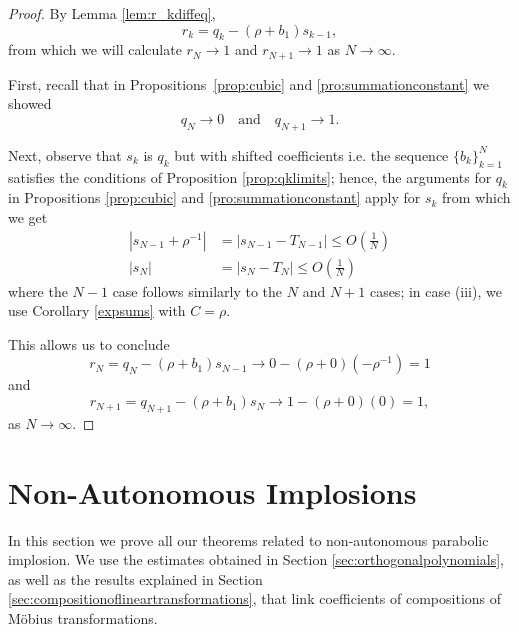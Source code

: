 \documentclass{amsart}
\theoremstyle{remark}
\theoremstyle{definition}
\newcommand{\lp}{\left(}
\newcommand{\rp}{\right)}
\begin{document}
\begin{proof}
    By Lemma \ref{lem:r_kdiffeq},
    \[r_k=q_k-(\rho+b_1)s_{k-1},\]
    from which we will calculate $r_N\rightarrow1$ and $r_{N+1}\rightarrow1$ as $N\rightarrow\infty$.

    First, recall that in Propositions~\ref{prop:cubic} and \ref{pro:summationconstant} we showed
    \[q_N\rightarrow0\quad \text{and}\quad q_{N+1}\rightarrow1.\]

    Next, observe that $s_k$ is $q_k$ but with shifted coefficients i.e. the sequence  $\{b_k\}_{k=1}^{N}$ satisfies the conditions of Proposition \ref{prop:qklimits}; hence, the arguments for $q_k$ in Propositions \ref{prop:cubic} and \ref{pro:summationconstant} apply for $s_k$ from which we get
    \begin{align*}
      |s_{N-1}+\rho^{-1}| &= |s_{N-1}-T_{N-1}| \leq O\left(\frac{1}{N}\right)\\
       |s_{N}| &= |s_{N}-T_{N}| \leq O\left(\frac{1}{N}\right)
    \end{align*}
    where the $N-1$ case follows similarly to the $N$ and $N+1$ cases; in case (iii), we use Corollary \ref{expsums} with $C=\rho$.
    
    This allows us to conclude
    \begin{equation*}
		r_N = q_N - (\rho+b_1)s_{N-1} \rightarrow 0 - \left(\rho+0\right)\lp -\rho^{-1}\rp = 1
	\end{equation*}
	and 
	\begin{equation*}
		r_{N+1} = q_{N+1} - (\rho+b_1)s_{N} \rightarrow 1 -(\rho+0)(0) = 1,
	\end{equation*}
	as $N\rightarrow\infty$. 
\end{proof}





\section{Non-Autonomous Implosions}\label{sec:nonautonomousimplosions}

In this section we prove all our theorems related to non-autonomous parabolic implosion. We use the estimates obtained in Section \ref{sec:orthogonalpolynomials}, as well as the results explained in Section \ref{sec:compositionoflineartransformations}, that link coefficients of compositions of M\"obius transformations.
\end{document}
